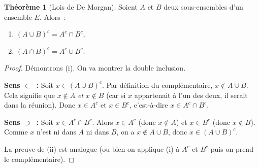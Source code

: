 \documentclass[12pt,a4paper,openany]{book}
\theoremstyle{definition}
\newtheorem{theoreme}{Théorème}[chapter]
\begin{document}
\bigskip
\begin{center}
\end{center}

\begin{theoreme}[Lois de De Morgan]\label{thm:de-morgan}
  Soient $A$ et $B$ deux sous-ensembles d'un ensemble $E$. Alors~:
  \begin{enumerate}[label=(\roman*)]
    \item $(A \cup B)^c = A^c \cap B^c$,
    \item $(A \cap B)^c = A^c \cup B^c$.
  \end{enumerate}
\end{theoreme}

\begin{proof}
  Démontrons (i). On va montrer la double inclusion.

  \textbf{Sens $\subset$~:} Soit $x \in (A \cup B)^c$. Par définition du complémentaire, $x \notin A \cup B$. Cela signifie que $x \notin A$ \emph{et} $x \notin B$ (car si $x$ appartenait à l'un des deux, il serait dans la réunion). Donc $x \in A^c$ et $x \in B^c$, c'est-à-dire $x \in A^c \cap B^c$.

  \textbf{Sens $\supset$~:} Soit $x \in A^c \cap B^c$. Alors $x \in A^c$ (donc $x \notin A$) et $x \in B^c$ (donc $x \notin B$). Comme $x$ n'est ni dans $A$ ni dans $B$, on a $x \notin A \cup B$, donc $x \in (A \cup B)^c$.

  La preuve de (ii) est analogue (ou bien on applique (i) à $A^c$ et $B^c$ puis on prend le complémentaire).
\end{proof}
\end{document}
